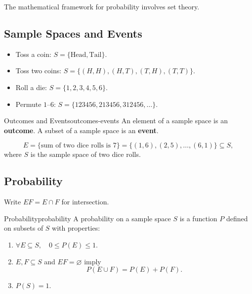 The mathematical framework for probability involves set theory.

\subsection{Sample Spaces and Events}

\begin{example}
  \begin{itemize}
    \item Toss a coin: $S=\{\text{Head},\text{Tail}\}$.
    \item Toss two coins: $S=\{(H,H),(H,T),(T,H),(T,T)\}$.
    \item Roll a die: $S=\{1,2,3,4,5,6\}$.
    \item Permute $1$--$6$: $S=\{123456,213456,312456,\ldots\}$.
  \end{itemize}
\end{example}

\begin{definition}{Outcomes and Events}{outcomes-events}
  An element of a sample space is an \textbf{outcome}.
  A subset of a sample space is an \textbf{event}.
\end{definition}

\begin{example}
  \[
    E=\{\text{sum of two dice rolls is }7\}
    =\{(1,6),(2,5),\ldots,(6,1)\}\subseteq S,
  \]
  where $S$ is the sample space of two dice rolls.
\end{example}

\subsection{Probability}

Write $EF=E\cap F$ for intersection.

\begin{definition}{Probability}{probability}
  A probability on a sample space $S$ is a function $P$ defined on subsets of $S$ with properties:
  \begin{enumerate}
    \item $\forall E\subseteq S,\quad 0\le P(E)\le1$.
    \item $E,F\subseteq S$ and $EF=\varnothing$ imply
          \[
            P(E\cup F)=P(E)+P(F).
          \]
    \item $P(S)=1$.
  \end{enumerate}
\end{definition}

